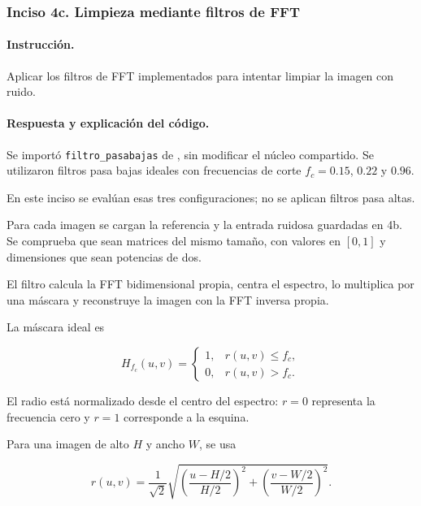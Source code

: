 \documentclass[11pt]{article}
\begin{document}
\FloatBarrier

\subsubsection*{Inciso 4c. Limpieza mediante filtros de FFT}

\paragraph{Instrucción.}

Aplicar los filtros de FFT implementados para intentar
limpiar la imagen con ruido.

\paragraph{Respuesta y explicación del código.}

Se importó \texttt{filtro\_pasabajas} de
, sin modificar el núcleo
compartido. Se utilizaron filtros pasa bajas ideales con
frecuencias de corte $f_c=0.15$, $0.22$ y $0.96$.

En este inciso se evalúan esas tres configuraciones;
no se aplican filtros pasa altas.

Para cada imagen se cargan la referencia y la entrada
ruidosa guardadas en 4b. Se comprueba que sean matrices
del mismo tamaño, con valores en $[0,1]$ y dimensiones
que sean potencias de dos.

El filtro calcula la FFT bidimensional propia, centra
el espectro, lo multiplica por una máscara y reconstruye
la imagen con la FFT inversa propia.

La máscara ideal es

\begin{equation}
 H_{f_c}(u,v)
 =
 \begin{cases}
 1, & r(u,v)\leq f_c,\\
 0, & r(u,v)>f_c.
 \end{cases}
\end{equation}

El radio está normalizado desde el centro del espectro:
$r=0$ representa la frecuencia cero y $r=1$ corresponde
a la esquina.

Para una imagen de alto $H$ y ancho $W$, se usa

\begin{equation}
 r(u,v)
 =
 \frac{1}{\sqrt{2}}
 \sqrt{
    \left(\frac{u-H/2}{H/2}\right)^2
    +
    \left(\frac{v-W/2}{W/2}\right)^2
 }.
\end{equation}
\end{document}
